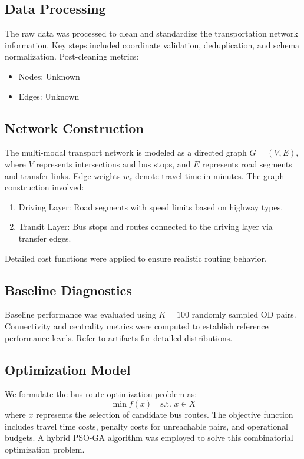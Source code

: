 
\subsection{Data Processing}
The raw data was processed to clean and standardize the transportation network information. 
Key steps included coordinate validation, deduplication, and schema normalization.
Post-cleaning metrics:
\begin{itemize}
    \item Nodes: Unknown
    \item Edges: Unknown
\end{itemize}

\subsection{Network Construction}
The multi-modal transport network is modeled as a directed graph $G=(V,E)$, where $V$ represents intersections and bus stops, and $E$ represents road segments and transfer links.
Edge weights $w_e$ denote travel time in minutes. The graph construction involved:
\begin{enumerate}
    \item Driving Layer: Road segments with speed limits based on highway types.
    \item Transit Layer: Bus stops and routes connected to the driving layer via transfer edges.
\end{enumerate}
Detailed cost functions were applied to ensure realistic routing behavior.

\subsection{Baseline Diagnostics}
Baseline performance was evaluated using $K=100$ randomly sampled OD pairs.
Connectivity and centrality metrics were computed to establish reference performance levels.
Refer to artifacts for detailed distributions.

\subsection{Optimization Model}
We formulate the bus route optimization problem as:
\begin{equation}
    \min f(x) \quad \text{s.t. } x \in X
\end{equation}
where $x$ represents the selection of candidate bus routes.
The objective function includes travel time costs, penalty costs for unreachable pairs, and operational budgets.
A hybrid PSO-GA algorithm was employed to solve this combinatorial optimization problem.
